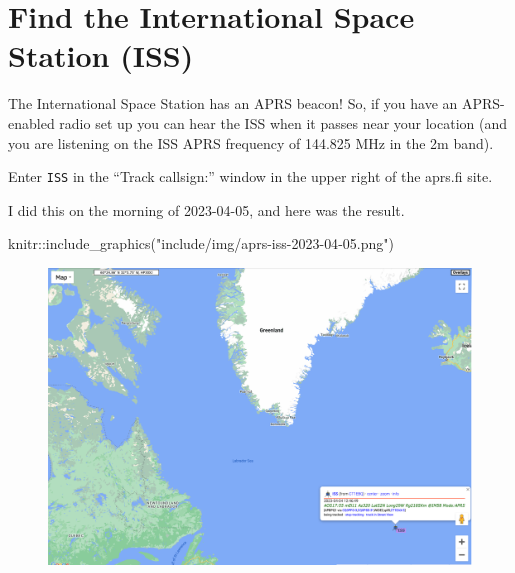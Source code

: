 \documentclass[
  letterpaper,
  DIV=11,
  numbers=noendperiod]{scrreport}
\newenvironment{Shaded}{\begin{snugshade}}{\end{snugshade}}
\newcommand{\FunctionTok}[1]{\textcolor[rgb]{0.28,0.35,0.67}{#1}}
\newcommand{\NormalTok}[1]{\textcolor[rgb]{0.00,0.23,0.31}{#1}}
\newcommand{\SpecialCharTok}[1]{\textcolor[rgb]{0.37,0.37,0.37}{#1}}
\newcommand{\StringTok}[1]{\textcolor[rgb]{0.13,0.47,0.30}{#1}}
\begin{document}
\hypertarget{find-the-international-space-station-iss}{%
\section*{Find the International Space Station
(ISS)}\label{find-the-international-space-station-iss}}


The International Space Station has an APRS beacon! So, if you have an
APRS-enabled radio set up you can hear the ISS when it passes near your
location (and you are listening on the ISS APRS frequency of 144.825 MHz
in the 2m band).

Enter \texttt{ISS} in the ``Track callsign:'' window in the upper right
of the aprs.fi site.

I did this on the morning of 2023-04-05, and here was the result.

\begin{Shaded}
\begin{Highlighting}[]
\NormalTok{knitr}\SpecialCharTok{::}\FunctionTok{include\_graphics}\NormalTok{(}\StringTok{"include/img/aprs{-}iss{-}2023{-}04{-}05.png"}\NormalTok{)}
\end{Highlighting}
\end{Shaded}

\begin{figure}[H]

{\centering \includegraphics{include/img/aprs-iss-2023-04-05.png}

}

\end{figure}
\end{document}
